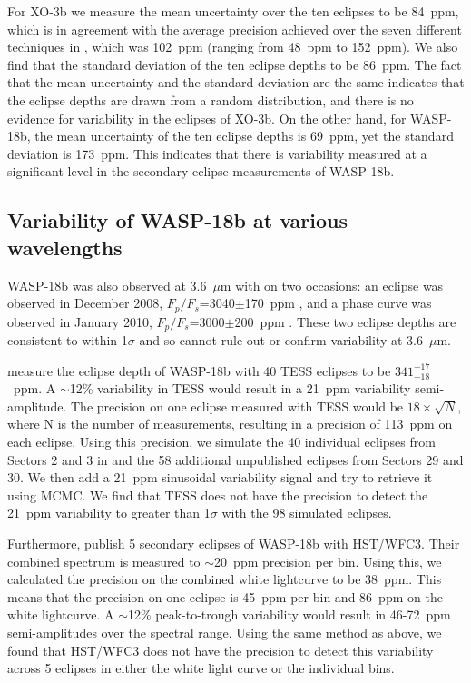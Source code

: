 For XO-3b we measure the mean uncertainty over the ten eclipses to be 84~ppm, which is in agreement with the average precision achieved over the seven different techniques in \citet{Ingalls2016}, which was 102~ppm (ranging from 48~ppm to 152~ppm). We also find that the standard deviation of the ten eclipse depths to be 86~ppm. The fact that the mean uncertainty and the standard deviation are the same indicates that the eclipse depths are drawn from a random distribution, and there is no evidence for variability in the eclipses of XO-3b. On the other hand, for WASP-18b, the mean uncertainty of the ten eclipse depths is 69~ppm, yet the standard deviation is 173~ppm. This indicates that there is variability measured at a significant level in the secondary eclipse measurements of WASP-18b.

\subsection{Variability of WASP-18b at various wavelengths}

WASP-18b was also observed at 3.6~$\mu$m with \spitzerIRAC on two occasions: an eclipse was observed in December 2008, $F_p/F_s$=3040$\pm$170~ppm \citep{Nymeyer2011}, and a phase curve was observed in January 2010, $F_p/F_s$=3000$\pm$200~ppm \citep{Maxted2013}. These two eclipse depths are consistent to within 1$\sigma$ and so cannot rule out or confirm variability at 3.6~$\mu$m.

\citet{Shporer2019} measure the eclipse depth of WASP-18b with 40 TESS eclipses to be $341^{+17}_{-18}$~ppm. A $\sim$12\% variability in TESS would result in a 21~ppm variability semi-amplitude. The precision on one eclipse measured with TESS would be $18\times\sqrt{N}$, where N is the number of measurements, resulting in a precision of 113~ppm on each eclipse. Using this precision, we simulate the 40 individual eclipses from Sectors 2 and 3 in \citet{Shporer2019} and the 58 additional unpublished eclipses from Sectors 29 and 30. We then add a 21~ppm sinusoidal variability signal and try to retrieve it using MCMC. We find that TESS does not have the precision to detect the 21~ppm variability to greater than 1$\sigma$ with the 98 simulated eclipses.

Furthermore, \citet{Arcangeli2018} publish 5 secondary eclipses of WASP-18b with HST/WFC3. Their combined spectrum is measured to $\sim$20~ppm precision per bin. Using this, we calculated the precision on the combined white lightcurve to be 38~ppm. This means that the precision on one eclipse is 45~ppm per bin and 86~ppm on the white lightcurve. A $\sim$12\% peak-to-trough variability would result in 46-72~ppm semi-amplitudes over the spectral range. Using the same method as above, we found that HST/WFC3 does not have the precision to detect this variability across 5 eclipses in either the white light curve or the individual bins.

